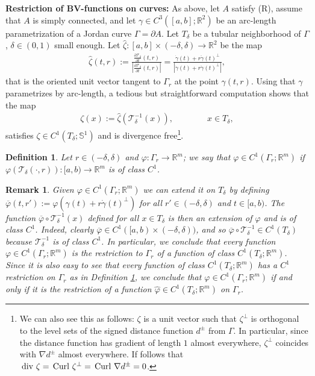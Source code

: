 \documentclass[a4paper,11pt]{article}
\numberwithin{equation}{section}
\newtheorem{remark}[theorem]{Remark}
\newtheorem{definition}[theorem]{Definition}
\def\curl{\,{\rm Curl\ }}
\def\div{\,{\rm div\ }}
\newcommand{\R}{\mathbb{R}}
\begin{document}
\textbf{Restriction of BV-functions on curves:}
As above, let $A$ satisfy (R), assume that $A$ is simply connected, and let  $\gamma\in C^3([a,b];\R^2)$ be an arc-length parametrization of a Jordan curve $\Gamma=\partial A$. Let $T_\delta$ be a tubular neighborhood of $\Gamma$, $\delta\in(0,1)$ small enough.
 Let $\widehat \zeta:[a,b]\times(-\delta,\delta)\rightarrow\R^2$ be the map
\begin{align}\label{zetahat}
\widehat \zeta(t,r):=\frac{\frac{\partial \mathcal T_\delta}{\partial t}(t,r)}{|\frac{\partial \mathcal T_\delta}{\partial t}(t,r)|}=\frac{\dot\gamma(t)+r\ddot\gamma(t)^\perp}{|\dot\gamma(t)+r\ddot\gamma(t)^\perp|},
\end{align}
that is the oriented unit vector tangent to $\Gamma_{r}$ at the point $\gamma(t,r)$. Using that $\gamma$ parametrizes by arc-length, a tedious but straightforward computation shows that the map
\begin{align}
	\zeta(x):=\widehat\zeta(\mathcal T_\delta^{-1}(x)),\qquad \qquad x\in T_\delta,\label{zeta}
\end{align}
satisfies  $\zeta\in C^1(T_\delta;\mathbb S^1)$ and is  divergence free\footnote{We can also see this as follows: $\zeta$ is a unit vector such that $\zeta^\perp$ is orthogonal to the level sets of the signed distance function $d^\pm$ from $\Gamma$. In particular, since the distance function has gradient of length $1$ almost everywhere, $\zeta^\perp$ coincides with $\nabla d^\pm$ almost everywhere. If follows that $\div \zeta=\curl \zeta^\perp=\curl \nabla d^\pm=0$.}.
\begin{definition}\label{defc1}
Let $r\in (-\delta,\delta)$ and  $\varphi:\Gamma_r\rightarrow \R^m$; we say that $\varphi\in C^1(\Gamma_{r};\R^m)$ if $\varphi(\mathcal T_\delta(\cdot,r)):[a,b)\rightarrow \R^m$ is of class $C^1$.
\end{definition}

\begin{remark}\label{rem_39}
Given $\varphi\in C^1(\Gamma_{r};\R^m)$ we can extend it on $T_\delta$ by defining $\overline \varphi(t,r'):=\varphi(\gamma(t)+r\dot\gamma(t)^\perp)$ for all $r'\in (-\delta,\delta)$ and $t\in [a,b)$. The function $\overline \varphi\circ \mathcal T_\delta^{-1}(x)$ defined for all $x\in T_\delta$ is then an extension of $\varphi$ and is of class $C^1$. Indeed, clearly $\overline \varphi\in C^1([a,b)\times (-\delta,\delta))$, and so $\overline \varphi\circ \mathcal T_\delta^{-1}\in C^1(T_\delta)$ because $\mathcal T_\delta^{-1}$ is of class $C^1$. In particular, we conclude that every function $\varphi\in C^1(\Gamma_{r};\R^m)$ is the restriction to $\Gamma_r$ of a function of class $C^1(T_\delta;\R^m)$. Since it is also easy to see that every function of class $C^1(T_\delta;\R^m)$ has a $C^1$ restriction on $\Gamma_r$ as in Definition \ref{defc1}, 
we conclude that $\varphi \in C^1(\Gamma_{r};\R^m)$ if and only if it is the restriction of a function $\widehat \varphi\in C^1(T_\delta;\R^m)$ on $\Gamma_r$.
\end{remark}
\end{document}
